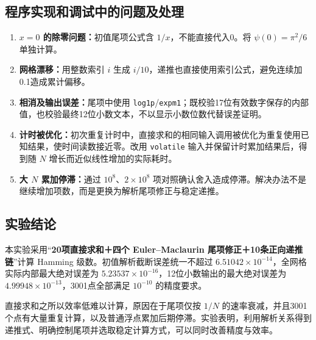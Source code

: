 \documentclass[UTF8,fontset=fandol,zihao=-4,a4paper]{ctexart}
\newcommand{\psif}{\psi}
\begin{document}
\subsection{程序实现和调试中的问题及处理}
\begin{enumerate}
 \item \textbf{$x=0$ 的除零问题：}初值尾项公式含 $1/x$，不能直接代入0。将 $\psif(0)=\pi^2/6$ 单独计算。
 \item \textbf{网格漂移：}用整数索引 $i$ 生成 $i/10$，递推也直接使用索引公式，避免连续加0.1造成累计偏移。
 \item \textbf{相消及输出误差：}尾项中使用 \texttt{log1p}/\texttt{expm1}；既校验17位有效数字保存的内部值，也校验最终12位小数文本，不以显示小数位数代替误差证明。
 \item \textbf{计时被优化：}初次重复计时中，直接求和的相同输入调用被优化为重复使用已知结果，使时间读数接近零。改用 \texttt{volatile} 输入并保留计时累加结果后，得到随 $N$ 增长而近似线性增加的实际耗时。
 \item \textbf{大 $N$ 累加停滞：}通过 $10^8$、$2\times10^8$ 项对照确认舍入造成停滞。解决办法不是继续增加项数，而是更换为解析尾项修正与稳定递推。
\end{enumerate}

\subsection{实验结论}
本实验采用“\textbf{20项直接求和＋四个 Euler--Maclaurin 尾项修正＋10条正向递推链}”计算 Hamming 级数。初值解析截断误差统一不超过 $6.51042\times10^{-14}$，全网格实际内部最大绝对误差为 $5.23537\times10^{-16}$，12位小数输出的最大绝对误差为 $4.99948\times10^{-13}$，3001点全部满足 $10^{-10}$ 的精度要求。

直接求和之所以效率低难以计算，原因在于尾项仅按 $1/N$ 的速率衰减，并且3001个点有大量重复计算，以及普通浮点累加后期停滞。实验表明，利用解析关系得到递推式、明确控制尾项并选取稳定计算方式，可以同时改善精度与效率。

\clearpage
\appendix
\end{document}

